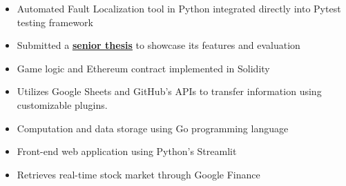 \begin{itemize}
    \item Automated Fault Localization tool in Python integrated directly into
          Pytest testing framework
    \item Submitted a
          \underline{\textbf{\href{https://noorbuchi.netlify.app/thesis/thesis.pdf}{senior
                      thesis}}} to showcase its features and evaluation
\end{itemize}
\begin{itemize}
    \item Game logic and Ethereum contract implemented in Solidity
\end{itemize}
\begin{itemize}
    \item Utilizes Google Sheets and GitHub's APIs to transfer information using
          customizable plugins.
\end{itemize}
\begin{itemize}
    \item Computation and data storage using Go programming language
    \item Front-end web application using Python's Streamlit
    \item Retrieves real-time stock market through Google Finance
\end{itemize}
